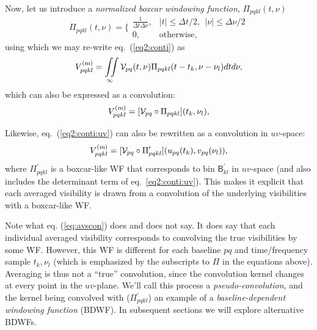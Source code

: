 \documentclass[useAMS,usenatbib]{mn2e}
\begin{document}
Now, let us introduce a \emph{normalized boxcar windowing function}, $\Pi_{pqkl}(t,\nu)$ 
\begin{equation}
\Pi_{pqkl}(t,\nu) = \bigg \{ \begin{array}{cl}
\frac{1}{\Delta t\Delta\nu}, &  |t|\leq\Delta t/2,~~|\nu|\leq\Delta\nu/2 \\
0, & \mathrm{otherwise},
\end{array}
\end{equation}
using which we may re-write eq.~(\ref{eq2:conti}) as
\begin{equation}
V^\mathrm{(m)}_{pqkl} =  
\iint\limits_{\infty}
\mathcal{V}_{pq}(t,\nu) \Pi_{pqkl}(t-t_k,\nu-\nu_l) dtd\nu,
\end{equation}
which can also be expressed as a convolution:
\begin{equation}
V^\mathrm{(m)}_{pqkl} = [ \mathcal{V}_{pq} \circ \Pi_{pqkl} ](t_k,\nu_l),
\end{equation}

Likewise, eq.~(\ref{eq2:conti:uv}) can also be rewritten as a convolution in $uv$-space:
\begin{equation}
V^\mathrm{(m)}_{pqkl} = [ \mathcal{V}_{pq} \circ \Pi^\prime_{pqkl} ](u_{pq}(t_k),v_{pq}(\nu_l)),
\label{eq:avscon}
\end{equation}
where $\Pi^\prime_{pqkl}$ is a boxcar-like WF that corresponds to bin $\mathsf{B}^\prime_{kl}$ in $uv$-space 
(and also includes the determinant term of eq.~\ref{eq2:conti:uv}). This makes it explicit that each averaged 
visibility is drawn from a convolution of the underlying visibilities with a boxcar-like WF.

Note what eq. (\ref{eq:avscon}) does and does not say. It does say that each individual averaged visibility corresponds to 
convolving the true visibilities by some WF. However, this WF is different for each baseline $pq$ and 
time/frequency sample $t_k,\nu_l$ (which is emphasized by the subscripts to $\Pi$ in the equations above). Averaging is thus 
not a ``true'' convolution, since the convolution kernel changes at every point in the $uv$-plane. We'll call this 
process a \emph{pseudo-convolution}, and the kernel being convolved with ($\Pi^\prime_{pqkl}$) an example of a 
\emph{baseline-dependent windowing function} (BDWF). In subsequent sections we will explore alternative BDWFs.
\end{document}
